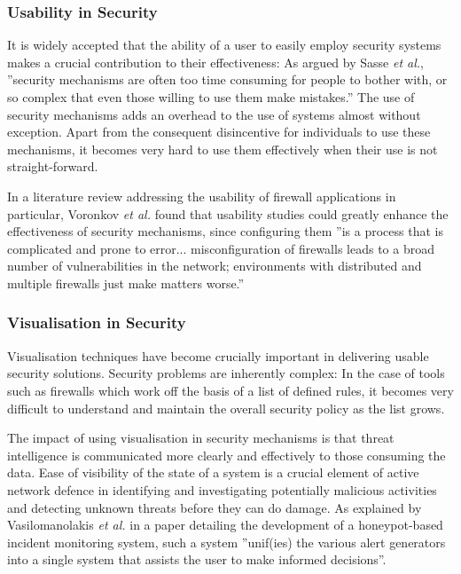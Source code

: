 
\subsubsection{Usability in Security}
It is widely accepted that the ability of a user to easily employ security systems makes a crucial contribution to their effectiveness: As argued by Sasse \textit{et al.}, ''security mechanisms are often too time consuming for people to bother with, or so complex that even those willing to use them make mistakes.'' \cite{7676149} The use of security mechanisms adds an overhead to the use of systems almost without exception. Apart from the consequent disincentive for individuals to use these mechanisms, it becomes very hard to use them effectively when their use is not straight-forward.

In a literature review addressing the usability of firewall applications in particular, Voronkov \textit{et al.} found that usability studies could greatly enhance the effectiveness of security mechanisms, since configuring them ''is a process that is complicated and prone to error...  misconfiguration of firewalls leads to a broad number of vulnerabilities in the network; environments with distributed and multiple firewalls just make matters worse.'' \cite{Voronkov:2017:SLR:3161158.3130876}

\subsubsection{Visualisation in Security}
Visualisation techniques have become crucially important in delivering usable security solutions. Security problems are inherently complex: In the case of tools such as firewalls which work off the basis of a list of defined rules, it becomes very difficult to understand and maintain the overall security policy as the list grows.

The impact of using visualisation in security mechanisms is that threat intelligence is communicated more clearly and effectively to those consuming the data. Ease of visibility of the state of a system is a crucial element of active network defence in identifying and investigating potentially malicious activities and detecting unknown threats before they can do damage. As explained by Vasilomanolakis \textit{et al.} in a paper detailing the development of a honeypot-based incident monitoring system, such a system ''unif(ies) the various alert generators into a single system that assists the user to make informed decisions''. \cite{Vasilomanolakis}




